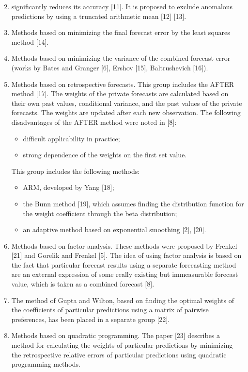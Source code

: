 \documentclass{article}
\begin{document}
\setcounter{page}{102}
\begin{multicols}{2}


\begin{enumerate}[noitemsep]
\setcounter{enumi}{1}
\item[] significantly reduces its accuracy [11]. It is proposed
to exclude anomalous predictions by using a truncated arithmetic mean [12] [13].
\item 
Methods based on minimizing the final forecast
error by the least squares method [14].

\item 
Methods based on minimizing the variance of
the combined forecast error (works by Bates and
Granger [6], Ershov [15], Baltrushevich [16]).

\item Methods based on retrospective forecasts. This
group includes the AFTER method [17]. The
weights of the private forecasts are calculated based
on their own past values, conditional variance, and
the past values of the private forecasts. The weights
are updated after each new observation.
The following disadvantages of the AFTER method
were noted in [8]:

\begin{itemize}[noitemsep]
    \item difficult applicability in practice;
    \item strong dependence of the weights on the first set
value. 
\end{itemize}
This group includes the following methods:
\begin{itemize}[noitemsep]
    \item ARM, developed by Yang [18];
    \item the Bunn method [19], which assumes finding
the distribution function for the weight coefficient
through the beta distribution;
    \item an adaptive method based on exponential smoothing [2], [20].
\end{itemize}

\item Methods based on factor analysis. These methods
were proposed by Frenkel [21] and Gorelik and
Frenkel [5]. The idea of using factor analysis is
based on the fact that particular forecast results
using a separate forecasting method are an external
expression of some really existing but immeasurable
forecast value, which is taken as a combined forecast
[8].
\item The method of Gupta and Wilton, based on finding
the optimal weights of the coefficients of particular
predictions using a matrix of pairwise preferences,
has been placed in a separate group [22].
\item Methods based on quadratic programming. The
paper [23] describes a method for calculating the
weights of particular predictions by minimizing the
retrospective relative errors of particular predictions
using quadratic programming methods.




\end{enumerate}
\end{multicols}
\end{document}
